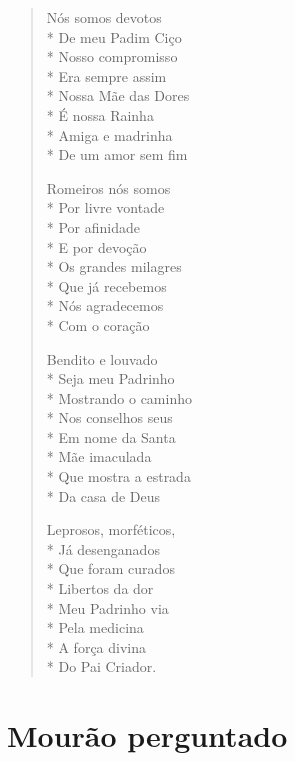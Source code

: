 \begin{verse}
Nós somos devotos\\*
De meu Padim Ciço\\*
Nosso compromisso\\*
Era sempre assim\\*
Nossa Mãe das Dores\\*
É nossa Rainha\\*
Amiga e madrinha\\*
De um amor sem fim

Romeiros nós somos\\*
Por livre vontade\\*
Por afinidade\\*
E por devoção\\*
Os grandes milagres\\*
Que já recebemos\\*
Nós agradecemos\\*
Com o coração

Bendito e louvado\\*
Seja meu Padrinho\\*
Mostrando o caminho\\*
Nos conselhos seus\\*
Em nome da Santa\\*
Mãe imaculada\\*
Que mostra a estrada\\*
Da casa de Deus

Leprosos, morféticos,\\*
Já desenganados\\*
Que foram curados\\*
Libertos da dor\\*
Meu Padrinho via\\*
Pela medicina\\*
A força divina\\*
Do Pai Criador.
\end{verse}


\chapter{Mourão perguntado}

